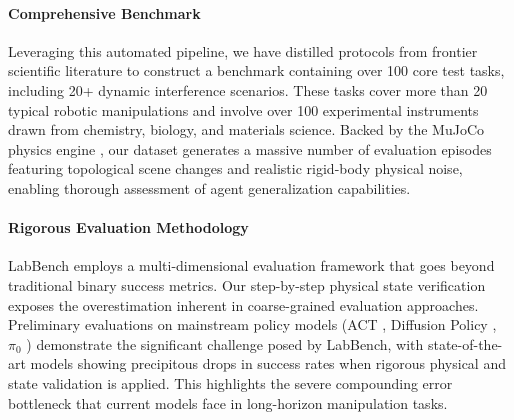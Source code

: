 \documentclass[letterpaper]{article} %
\begin{document}
\paragraph{Comprehensive Benchmark}
Leveraging this automated pipeline, we have distilled protocols from frontier scientific literature to construct a benchmark containing over 100 core test tasks, including 20+ dynamic interference scenarios. These tasks cover more than 20 typical robotic manipulations and involve over 100 experimental instruments drawn from chemistry, biology, and materials science. Backed by the MuJoCo physics engine \cite{todorov2012mujoco}, our dataset generates a massive number of evaluation episodes featuring topological scene changes and realistic rigid-body physical noise, enabling thorough assessment of agent generalization capabilities.

\paragraph{Rigorous Evaluation Methodology}
LabBench employs a multi-dimensional evaluation framework that goes beyond traditional binary success metrics. Our step-by-step physical state verification exposes the overestimation inherent in coarse-grained evaluation approaches. Preliminary evaluations on mainstream policy models (ACT \cite{lee2021learning}, Diffusion Policy \cite{chi2023diffusion}, $\pi_0$ \cite{team2024open}) demonstrate the significant challenge posed by LabBench, with state-of-the-art models showing precipitous drops in success rates when rigorous physical and state validation is applied. This highlights the severe compounding error bottleneck that current models face in long-horizon manipulation tasks.
\end{document}
